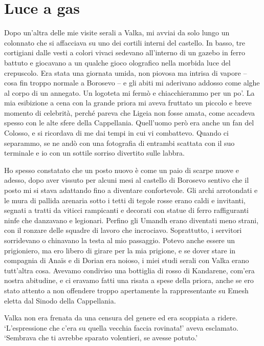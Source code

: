 \chapter{Luce a gas}

Dopo un'altra delle mie visite serali a Valka, mi avviai da solo lungo
un colonnato che si affacciava su uno dei cortili interni del castello.
In basso, tre cortigiani dalle vesti a colori vivaci sedevano
all'interno di un gazebo in ferro battuto e giocavano a un qualche gioco
olografico nella morbida luce del crepuscolo. Era stata una giornata
umida, non piovosa ma intrisa di vapore -- cosa fin troppo normale a
Borosevo -- e gli abiti mi aderivano addosso come alghe al corpo di un
annegato. Un logoteta mi fermò e chiacchierammo per un po'. La mia
esibizione a cena con la grande priora mi aveva fruttato un piccolo e
breve momento di celebrità, perché pareva che Ligeia non fosse amata,
come accadeva spesso con le alte sfere della Cappellania. Quell'uomo
però era anche un fan del Colosso, e si ricordava di me dai tempi in cui
vi combattevo. Quando ci separammo, se ne andò con una fotografia di
entrambi scattata con il suo terminale e io con un sottile sorriso
divertito sulle labbra.

Ho spesso constatato che un posto nuovo è come un paio di scarpe nuove e
adesso, dopo aver vissuto per alcuni mesi al castello di Borosevo
sentivo che il posto mi si stava adattando fino a diventare
confortevole. Gli archi arrotondati e le mura di pallida arenaria sotto
i tetti di tegole rosse erano caldi e invitanti, segnati a tratti da
viticci rampicanti e decorati con statue di ferro raffiguranti ninfe che
danzavano e legionari. Perfino gli Umandh erano diventati meno strani,
con il ronzare delle squadre di lavoro che incrociavo. Soprattutto, i
servitori sorridevano o chinavano la testa al mio passaggio. Potevo
anche essere un prigioniero, ma ero {libero} di girare per la mia
prigione, e se dover stare in compagnia di Anaïs e di Dorian era noioso,
i miei studi serali con Valka erano tutt'altra cosa. Avevamo condiviso
una bottiglia di rosso di Kandarene, com'era nostra abitudine, e ci
eravamo fatti una risata a spese della priora, anche se ero stato
attento a non offendere troppo apertamente la rappresentante su Emesh
eletta dal Sinodo della Cappellania.

Valka non era frenata da una censura del genere ed era scoppiata a
ridere. `L'espressione che c'era su quella vecchia faccia rovinata!'
aveva esclamato. `Sembrava che ti avrebbe sparato volentieri, se avesse
potuto.'

